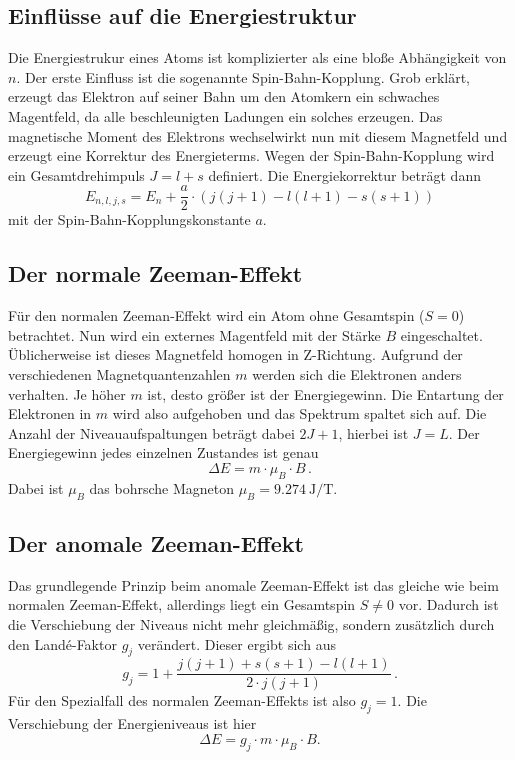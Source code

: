 \subsection{Einflüsse auf die Energiestruktur}
\label{ssec:theo2}

Die Energiestrukur eines Atoms ist komplizierter als eine bloße Abhängigkeit von $n$.
Der erste Einfluss ist die sogenannte Spin-Bahn-Kopplung.
Grob erklärt, erzeugt das Elektron auf seiner Bahn um den Atomkern ein schwaches Magentfeld, da alle beschleunigten Ladungen ein solches erzeugen.
Das magnetische Moment des Elektrons wechselwirkt nun mit diesem Magnetfeld und erzeugt eine Korrektur des Energieterms. 
Wegen der Spin-Bahn-Kopplung wird ein Gesamtdrehimpuls $J = l + s$ definiert.
Die Energiekorrektur beträgt dann 
\begin{equation}
    E_{n,l,j,s} = E_n + \frac{a}{2} \cdot \left( j(j+1) - l(l+1) - s(s+1) \right)
   \label{eq:spinbahn}
\end{equation}
mit der Spin-Bahn-Kopplungskonstante $a$.

\subsection{Der normale Zeeman-Effekt}
\label{ssec:theo3}

Für den normalen Zeeman-Effekt wird ein Atom ohne Gesamtspin ($S = 0$) betrachtet. 
Nun wird ein externes Magentfeld mit der Stärke $B$ eingeschaltet. 
Üblicherweise ist dieses Magnetfeld homogen in Z-Richtung. 
Aufgrund der verschiedenen Magnetquantenzahlen $m$ werden sich die Elektronen anders verhalten. Je höher $m$ ist, desto größer ist der Energiegewinn.
Die Entartung der Elektronen in $m$ wird also aufgehoben und das Spektrum spaltet sich auf.
Die Anzahl der Niveauaufspaltungen beträgt dabei $2 J + 1$, hierbei ist $J = L$.
Der Energiegewinn jedes einzelnen Zustandes ist genau 
\begin{equation}
    \Delta E = m \cdot \mu_B \cdot B \, .
   \label{eq:normzeeman}
\end{equation}
Dabei ist $\mu_B$ das bohrsche Magneton $\mu_B = \SI{9.274}{\joule\per\tesla}$.

\subsection{Der anomale Zeeman-Effekt}
\label{ssec:theo4}

Das grundlegende Prinzip beim anomale Zeeman-Effekt ist das gleiche wie beim normalen Zeeman-Effekt, allerdings liegt ein Gesamtspin $S \neq 0$ vor.
Dadurch ist die Verschiebung der Niveaus nicht mehr gleichmäßig, sondern zusätzlich durch den Landé-Faktor $g_j$ verändert. 
Dieser ergibt sich aus 
\begin{equation}
    g_j = 1 + \frac{j(j+1) + s(s+1) - l(l+1) }{2 \cdot j(j+1)} \, .
   \label{eq:lande}
\end{equation}
Für den Spezialfall des normalen Zeeman-Effekts ist also $g_j=1$.
Die Verschiebung der Energieniveaus ist hier
\begin{equation}
    \Delta E = g_j \cdot m \cdot \mu_B \cdot B.
   \label{eq:anomzeeman}
\end{equation}

